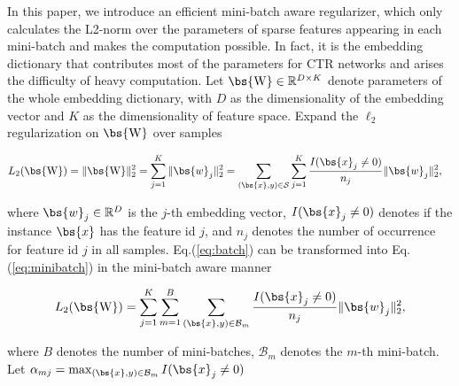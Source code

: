 In this paper, we introduce an efficient mini-batch aware regularizer, which only calculates the L2-norm over the parameters of sparse features appearing in each mini-batch and makes the computation possible.     
In fact, it is the embedding dictionary that contributes most of the parameters for CTR networks and arises the difficulty of heavy computation. 
Let $\bs{\mathrm{W}}\in\mathbb{R}^{D\times K}$ denote parameters of the whole embedding dictionary, with $D$ as the dimensionality of the embedding vector and $K$ as the dimensionality of feature space. 
Expand the $\ell_2$ regularization on $\bs{\mathrm{W}}$ over samples 
\begin{footnotesize}
\begin{eqnarray}
\begin{split}
\label{eq:batch}
L_2(\bs{\mathrm{W}}) &= \|\bs{\mathrm{W}}\|_2^2 = \sum_{j=1}^{K}\|\bs{w}_j\|_2^2 = \sum_{(\bs{x},y)\in\mathcal{S}}\sum_{j=1}^{K} \frac{I(\bs{x}_j\neq0)}{n_{j}}\|\bs{w}_j\|_2^2,
\end{split}
\end{eqnarray}
\end{footnotesize}
where $\bs{w}_j\in\mathbb{R}^{D}$ is the $j$-th embedding vector,
$I(\bs{x}_j\neq0)$ denotes if the instance $\bs{x}$ has the feature id $j$, and $n_j$ denotes the number of occurrence for feature id $j$ in all samples. %
Eq.(\ref{eq:batch}) can be transformed into Eq.(\ref{eq:minibatch}) in the mini-batch aware manner 
\begin{small}
\begin{equation}
\label{eq:minibatch}
L_2(\bs{\mathrm{W}}) = \sum_{j=1}^{K}\sum_{m=1}^{B}\sum_{(\bs{x},y)\in\mathcal{B}_m}\frac{I(\bs{x}_j\neq 0)}{n_{j}}\|\bs{w}_j\|_2^2,
\end{equation}
\end{small}
where $B$ denotes the number of mini-batches, $\mathcal{B}_m$ denotes the $m$-th mini-batch.
Let $\alpha_{mj} = \max_{(\bs{x},y)\in\mathcal{B}_m} I(\bs{x}_j\neq0)$
